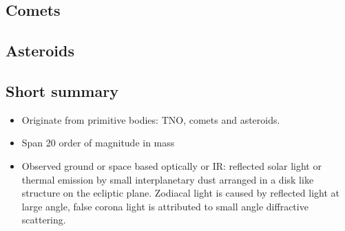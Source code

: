 \subsection{Comets}

\subsection{Asteroids}

\subsection{Short summary}
\begin{itemize}
\item Originate from primitive bodies: TNO, comets and asteroids.
\item Span 20 order of magnitude in mass
\item Observed ground or space based optically or IR: reflected solar light or thermal emission by small interplanetary dust arranged in a disk like structure on the ecliptic plane.
Zodiacal light is caused by reflected light at large angle, false corona light is attributed to small angle diffractive scattering.
\end{itemize}


